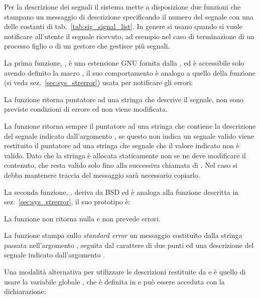 Per la descrizione dei segnali il sistema mette a disposizione due funzioni
che stampano un messaggio di descrizione specificando il numero del segnale
con una delle costanti di tab.~\ref{tab:sig_signal_list}.  In genere si usano
quando si vuole notificare all'utente il segnale ricevuto, ad esempio nel caso
di terminazione di un processo figlio o di un gestore che gestisce più
segnali.

La prima funzione, , è una estensione GNU fornita dalla
, ed è accessibile solo avendo definito la macro
, il suo comportamento è analogo a quello della funzione
 (si veda sez.~\ref{sec:sys_strerror}) usata per notificare gli
errori:

\begin{funcproto}{
}

{La funzione ritorna puntatore ad una stringa che descrive il segnale, non
  sono previste condizioni di errore ed  non viene modificata.}
\end{funcproto}


La funzione ritorna sempre il puntatore ad una stringa che contiene la
descrizione del segnale indicato dall'argomento , se questo non
indica un segnale valido viene restituito il puntatore ad una stringa che
segnale che il valore indicato non è valido.  Dato che la stringa è allocata
staticamente non se ne deve modificare il contenuto, che resta valido solo
fino alla successiva chiamata di . Nel caso si debba mantenere
traccia del messaggio sarà necessario copiarlo.

La seconda funzione, , deriva da BSD ed è analoga alla funzione
 descritta in sez.~\ref{sec:sys_strerror}, il suo prototipo è:

\begin{funcproto}{
}
{La funzione non ritorna nulla e non prevede errori.}  
\end{funcproto}

La funzione stampa sullo \textit{standard error} un messaggio costituito dalla
stringa passata nell'argomento , seguita dal carattere di due punti
ed una descrizione del segnale indicato dall'argomento . 

Una modalità alternativa per utilizzare le descrizioni restituite da
 e  è quello di usare la variabile globale
, che è definita in  e può essere
acceduta con la dichiarazione:

